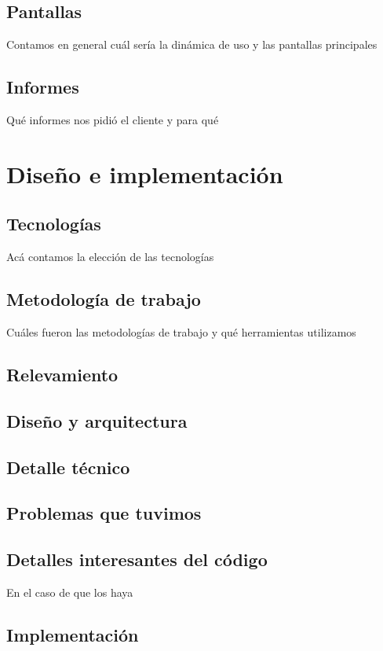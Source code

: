 \documentclass[a4paper,10pt]{article}
\begin{document}
\subsection{Pantallas}
Contamos en general cuál sería la dinámica de uso y las pantallas principales
\subsection{Informes}
Qué informes nos pidió el cliente y para qué



\newpage 
\section{Diseño e implementación}
\subsection{Tecnologías}
Acá contamos la elección de las tecnologías

\subsection{Metodología de trabajo}
Cuáles fueron las metodologías de trabajo y qué herramientas utilizamos

\subsection{Relevamiento}

\subsection{Diseño y arquitectura}

\subsection{Detalle técnico}

\subsection{Problemas que tuvimos}

\subsection{Detalles interesantes del código}
En el caso de que los haya 

\subsection{Implementación}
\end{document}
